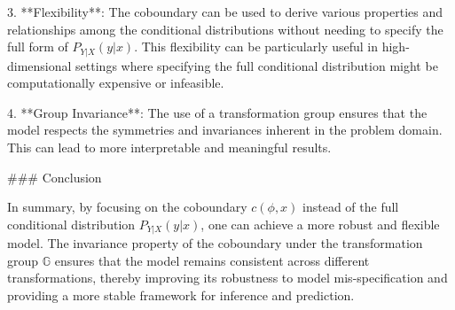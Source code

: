 3. **Flexibility**: The coboundary can be used to derive various properties and relationships among the conditional distributions without needing to specify the full form of \(P_{Y|X}(y|x)\). This flexibility can be particularly useful in high-dimensional settings where specifying the full conditional distribution might be computationally expensive or infeasible.

4. **Group Invariance**: The use of a transformation group ensures that the model respects the symmetries and invariances inherent in the problem domain. This can lead to more interpretable and meaningful results.

### Conclusion

In summary, by focusing on the coboundary \(c(\phi, x)\) instead of the full conditional distribution \(P_{Y|X}(y|x)\), one can achieve a more robust and flexible model. The invariance property of the coboundary under the transformation group \(\mathbb{G}\) ensures that the model remains consistent across different transformations, thereby improving its robustness to model mis-specification and providing a more stable framework for inference and prediction.